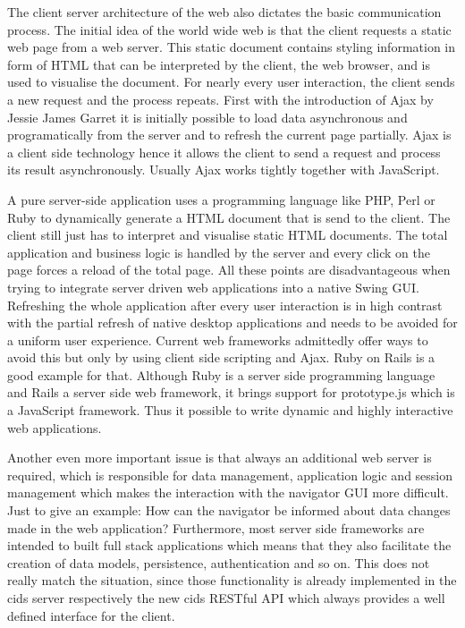 The client server architecture of the web also dictates the basic communication process.
The initial idea of the world wide web is that the client requests a static web page from a web server.
This static document contains styling information in form of HTML that can be interpreted by the client, the web browser, and is used to visualise the document.
For nearly every user interaction, the client sends a new request and the process repeats.
First with the introduction of Ajax by Jessie James Garret \autocite[]{ajax} it is initially possible to load data asynchronous and programatically from the server and to refresh the current page partially.
Ajax is a client side technology hence it allows the client to send a request and process its result asynchronously.
Usually Ajax works tightly together with JavaScript.

A pure server-side application uses a programming language like PHP, Perl or Ruby to dynamically generate a HTML document that is send to the client.
The client still just has to interpret and visualise static HTML documents.
The total application and business logic is handled by the server and every click on the page forces a reload of the total page.
All these points are disadvantageous when trying to integrate server driven web applications into a native Swing GUI.
Refreshing the whole application after every user interaction is in high contrast with the partial refresh of native desktop applications and needs to be avoided for a uniform user experience.
Current web frameworks admittedly offer ways to avoid this but only by using client side scripting and Ajax.
Ruby on Rails is a good example for that.
Although Ruby is a server side programming language and Rails a server side web framework, it brings support for prototype.js which is a JavaScript framework. Thus it possible to write dynamic and highly interactive web applications.

Another even more important issue is that always an additional web server is required, which is responsible for data management, application logic and session management which makes the interaction with the navigator GUI more difficult.
Just to give an example: How can the navigator be informed about data changes made in the web application? Furthermore, most server side frameworks are intended to built full stack applications which means that they also facilitate the creation of data models, persistence, authentication and so on.
This does not really match the situation, since those functionality is already implemented in the cids server respectively the new cids RESTful API which always provides a well defined interface for the client.

